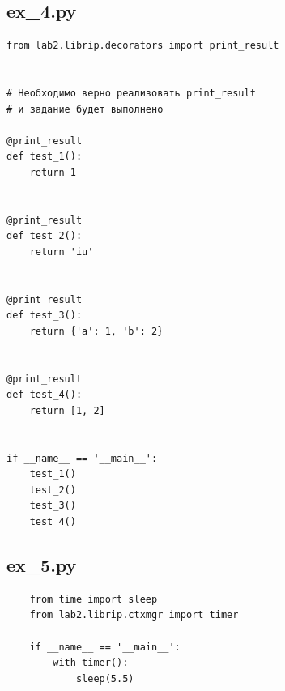 \documentclass{article}
\begin{document}
\subsection{ex\_4.py}
\begin{verbatim}
from lab2.librip.decorators import print_result


# Необходимо верно реализовать print_result
# и задание будет выполнено

@print_result
def test_1():
    return 1
    
    
@print_result
def test_2():
    return 'iu'
    
    
@print_result
def test_3():
    return {'a': 1, 'b': 2}
    
    
@print_result
def test_4():
    return [1, 2]
    
    
if __name__ == '__main__':
    test_1()
    test_2()
    test_3()
    test_4()        
\end{verbatim}

\subsection{ex\_5.py}
\begin{verbatim}
    from time import sleep
    from lab2.librip.ctxmgr import timer
    
    if __name__ == '__main__':
        with timer():
            sleep(5.5)    
\end{verbatim}
\end{document}
